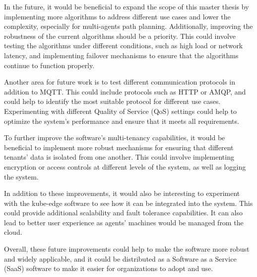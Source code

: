 In the future, it would be beneficial to expand the scope of this master thesis by implementing more algorithms to address different use cases and lower the complexity, especially for multi-agents path planning. Additionally, improving the robustness of the current algorithms should be a priority. This could involve testing the algorithms under different conditions, such as high load or network latency, and implementing failover mechanisms to ensure that the algorithms continue to function properly.

Another area for future work is to test different communication protocols in addition to MQTT. This could include protocols such as HTTP or AMQP, and could help to identify the most suitable protocol for different use cases. Experimenting with different Quality of Service (QoS) settings could help to optimize the system's performance and ensure that it meets all requirements.

To further improve the software's multi-tenancy capabilities, it would be beneficial to implement more robust mechanisms for ensuring that different tenants' data is isolated from one another. This could involve implementing encryption or access controls at different levels of the system, as well as logging the system.

In addition to these improvements, it would also be interesting to experiment with the kube-edge software to see how it can be integrated into the system. This could provide additional scalability and fault tolerance capabilities. It can also lead to better user experience as agents' machines would be managed from the cloud.

Overall, these future improvements could help to make the software more robust and widely applicable, and it could be distributed as a Software as a Service (SaaS) software to make it easier for organizations to adopt and use.